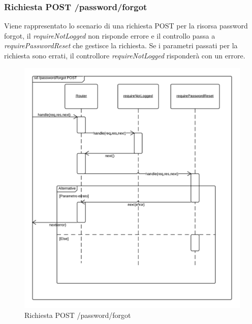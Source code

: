\subsubsection{Richiesta POST /password/forgot} 
Viene rappresentato lo scenario di una richiesta POST per la risorsa password forgot, il \emph{requireNotLogged} non risponde errore e il controllo passa a \emph{requirePasswordReset} che gestisce la richiesta.
Se i parametri passati per la richiesta sono errati, il controllore \emph{requireNotLogged} risponderà con un errore.
\begin{figure}[H]
	\begin{center} 
		\includegraphics[scale=0.20]{scenari/Password Forgot POST.png} 
		\caption{Richiesta POST /password/forgot}
	\end{center} 
\end{figure}

\pagebreak
